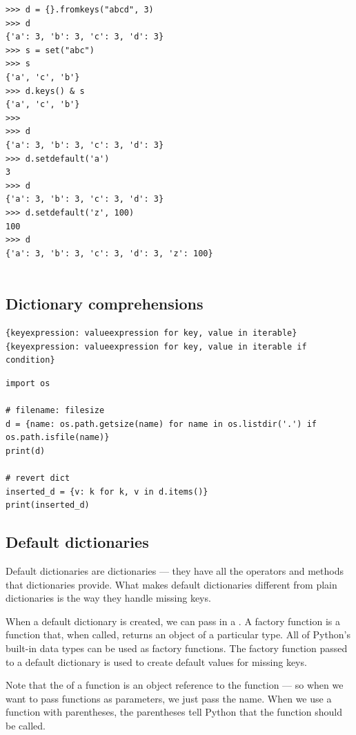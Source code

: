 \begin{lstlisting}
>>> d = {}.fromkeys("abcd", 3)
>>> d
{'a': 3, 'b': 3, 'c': 3, 'd': 3}
>>> s = set("abc")
>>> s
{'a', 'c', 'b'}
>>> d.keys() & s
{'a', 'c', 'b'}
>>> 
>>> d
{'a': 3, 'b': 3, 'c': 3, 'd': 3}
>>> d.setdefault('a')
3
>>> d
{'a': 3, 'b': 3, 'c': 3, 'd': 3}
>>> d.setdefault('z', 100)
100
>>> d
{'a': 3, 'b': 3, 'c': 3, 'd': 3, 'z': 100}  
  
\end{lstlisting}




\subsection{Dictionary comprehensions}

\begin{lstlisting}
{keyexpression: valueexpression for key, value in iterable}
{keyexpression: valueexpression for key, value in iterable if condition}
\end{lstlisting}


\begin{lstlisting}
import os

# filename: filesize
d = {name: os.path.getsize(name) for name in os.listdir('.') if os.path.isfile(name)}
print(d)

# revert dict
inserted_d = {v: k for k, v in d.items()}
print(inserted_d)  
\end{lstlisting}


\subsection{Default dictionaries}

Default dictionaries are dictionaries --- they have all the operators and methods that dictionaries provide.
What makes default dictionaries different from plain dictionaries is the way they handle missing keys.



When a default dictionary is created, we can pass in a .
A factory function is a function that, when called, returns an object of a particular type.
All of Python’s built-in data types can be used as factory functions.
The factory function passed to a default dictionary is used to create default values for missing keys.


\begin{tcolorbox}
  Note that the  of a function is an object reference to the function --- so when we want to pass functions as parameters, we just pass the name.
  When we use a function with parentheses, the parentheses tell Python that the function should be called.
\end{tcolorbox}

